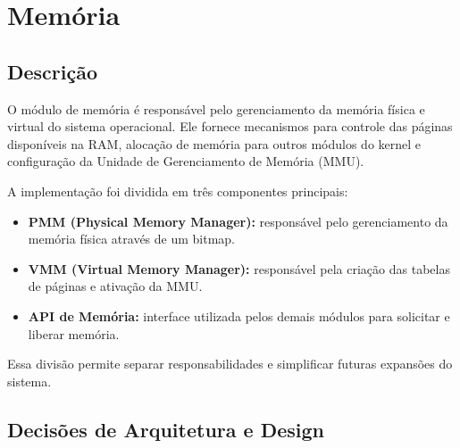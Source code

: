 \chapter{Memória}


\section{Descrição}
%
O módulo de memória é responsável pelo gerenciamento da memória física e virtual do sistema operacional. Ele fornece mecanismos para controle das páginas disponíveis na RAM, alocação de memória para outros módulos do kernel e configuração da Unidade de Gerenciamento de Memória (MMU).

A implementação foi dividida em três componentes principais:

\begin{itemize}
\item \textbf{PMM (Physical Memory Manager):} responsável pelo gerenciamento da memória física através de um bitmap.
\item \textbf{VMM (Virtual Memory Manager):} responsável pela criação das tabelas de páginas e ativação da MMU.
\item \textbf{API de Memória:} interface utilizada pelos demais módulos para solicitar e liberar memória.
\end{itemize}

Essa divisão permite separar responsabilidades e simplificar futuras expansões do sistema.

\section{Decisões de Arquitetura e Design}
%
%

